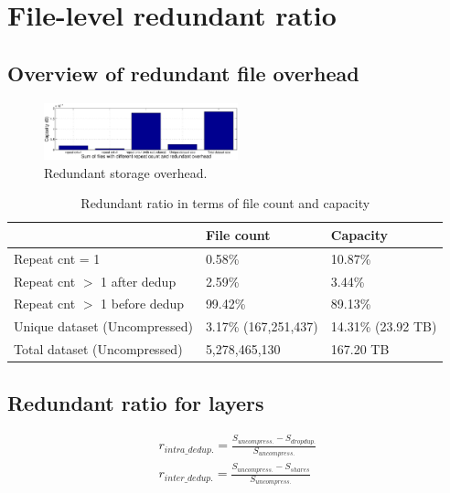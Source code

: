 \section{File-level redundant ratio}
\label{sec:dedup}

\subsection{Overview of redundant file overhead}

\begin{figure}
	\centering
	\includegraphics[width=0.5\textwidth]{graphs/capacity_data_ratio.eps}
	\caption{Redundant storage overhead.
	}
	\label{fig:overview_redundant_overhead}
\end{figure}

\begin{table} 
	\centering 
	\scriptsize  
	\caption{Redundant ratio in terms of file count and capacity} \label{tbl:overall-redundant_ratio} 
	\begin{tabular}{|l|l|l|}%
		\hline  
		       & File count & Capacity \\
		\hline
		Repeat cnt = 1 & 0.58\% & 10.87\%\\
		\hline
		Repeat cnt $>$ 1 after dedup & 2.59\% & 3.44\%\\
		\hline
		Repeat cnt $>$ 1 before dedup  & 99.42\%  & 89.13\%\\
		\hline
		Unique dataset (Uncompressed) & 3.17\% (167,251,437)  &  14.31\% (23.92 TB) \\
		\hline 
		Total dataset (Uncompressed) & 5,278,465,130 & 167.20 TB \\
		\hline 	
	\end{tabular} 
\end{table} 

\subsection{Redundant ratio for layers}

\begin{eqnarray}
r_{intra\_dedup.} = \frac{S_{uncompress.} - S_{dropdup.}}{S_{uncompress.}} \\
r_{inter\_dedup.} = \frac{S_{uncompress.} - S_{shares}}{S_{uncompress.}}
\end{eqnarray}

